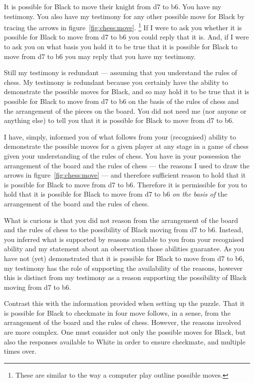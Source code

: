 \documentclass[10pt]{article}
\begin{document}



It is possible for Black to move their knight from d7 to b6.
You have my testimony.
You also have my testimony for any other possible move for Black by tracing the arrows in figure~\ref{fig:chess:move}.\nolinebreak
\footnote{
  These are similar to the way a computer play outline possible moves.
}
If I were to ask you whether it is possible for Black to move from d7 to b6 you could reply that it is.
And, if I were to ask you on what basis you hold it to be true that it is possible for Black to move from d7 to b6 you may reply that you have my testimony.

Still my testimony is redundant --- assuming that you understand the rules of chess.
My testimony is redundant because you certainly have the ability to demonstrate the possible moves for Black, and so may hold it to be true that it is possible for Black to move from d7 to b6 on the basis of the rules of chess and the arrangement of the pieces on the board.
You did not need me (nor anyone or anything else) to tell you that it is possible for Black to move from d7 to b6.

I have, simply, informed you of what follows from your (recognised) ability to demonstrate the possible moves for a given player at any stage in a game of chess given your understanding of the rules of chess.
You have in your possession the arrangement of the board and the rules of chess --- the reasons I used to draw the arrows in figure~\ref{fig:chess:move} --- and therefore sufficient reason to hold that it is possible for Black to move from d7 to b6.
Therefore it is permissible for you to hold that it is possible for Black to move from d7 to b6 \emph{on the basis of} the arrangement of the board and the rules of chess.

What is curious is that you did not reason from the arrangement of the board and the rules of chess to the possibility of Black moving from d7 to b6.
Instead, you inferred what is supported by reasons available to you from your recognised ability and my statement about an observation those abilities guarantee.
As you have not (yet) demonstrated that it is possible for Black to move from d7 to b6, my testimony has the role of supporting the availability of the reasons, however this is distinct from my testimony as a reason supporting the possibility of Black moving from d7 to b6.

Contrast this with the information provided when setting up the puzzle.
That it is possible for Black to checkmate in four move follows, in a sense, from the arrangement of the board and the rules of chess.
However, the reasons involved are more complex.
One must consider not only the possible moves for Black, but also the responses available to White in order to ensure checkmate, and multiple times over.
\end{document}
